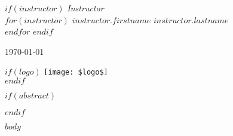\documentclass[12pt]{article}
\begin{document}
\begin{titlepage}
\begin{minipage}{0.4\textwidth}
\begin{flushright}
            $if(instructor)$
                \large
                \textit{Instructor}\\
                $for(instructor)$
                    $instructor.firstname$ \textsc{$instructor.lastname$}\\
                $endfor$
            $endif$
		\end{flushright}
	\end{minipage}
	


	\vfill\vfill %
	
	{\large\today} %
	
	
    $if(logo)$
	\vfill\vfill
	\texttt{[image: \$logo\$]}\\[1cm] %
    $endif$
	 
	
	\vfill %
	
\end{titlepage}

$if(abstract)$
\begin{abstract}
    $abstract$
\end{abstract}
$endif$

$body$



\end{document}
